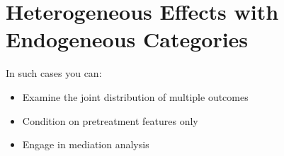 \documentclass[11pt,ignorenonframetext,]{beamer}
\begin{document}
\section{Heterogeneous Effects with Endogeneous
Categories}\label{heterogeneous-effects-with-endogeneous-categories-4}

In such cases you can:

\begin{itemize}
\item Examine the joint distribution of multiple outcomes
\item Condition on pretreatment features only
\item Engage in mediation analysis
\end{itemize}
\end{document}
